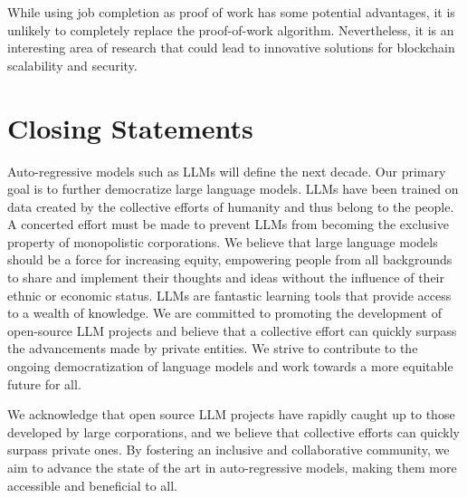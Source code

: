 \documentclass{article}
\begin{document}
While using job completion as proof of work has some potential advantages, it is unlikely to completely replace the proof-of-work algorithm. Nevertheless, it is an interesting area of research that could lead to innovative solutions for blockchain scalability and security.

\section {Closing Statements}
Auto-regressive models such as LLMs will define the next decade. Our primary goal is to further democratize large language models.
LLMs have been trained on data created by the collective efforts of humanity and thus belong to the people. 
A concerted effort must be made to prevent LLMs from becoming the exclusive property of monopolistic corporations. 
We believe that large language models should be a force for increasing equity, empowering people from all backgrounds to share and implement their thoughts and ideas without the influence of their ethnic or economic status. 
LLMs are fantastic learning tools that provide access to a wealth of knowledge. 
We are committed to promoting the development of open-source LLM projects and believe that a collective effort can quickly surpass the advancements made by private entities. 
We strive to contribute to the ongoing democratization of language models and work towards a more equitable future for all.

We acknowledge that open source LLM projects have rapidly caught up to those developed by large corporations, and we believe that collective efforts can quickly surpass private ones. 
By fostering an inclusive and collaborative community, we aim to advance the state of the art in auto-regressive models, making them more accessible and beneficial to all.
\end{document}
